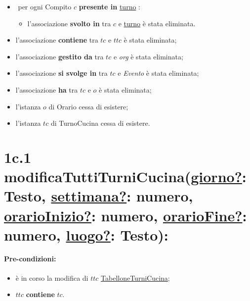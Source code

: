 {\begin{itemize}
   \item \textlangle $ $ per ogni Compito $c$ \textbf{presente in} \underline{turno} \textrangle:
    \begin{itemize}
        \item l'associazione \textbf{svolto in} tra $c$ e \underline{turno} è stata eliminata.
    \end{itemize}
    \item l'associazione \textbf{contiene} tra $tc$ e $ttc$ è stata eliminata;
    \item l'associazione \textbf{gestito da} tra $tc$ e \textit{org} è stata eliminata;
\item l'associazione \textbf{si svolge in} tra $tc$ e \textit{Evento} è stata eliminata;
    \item l'associazione \textbf{ha} tra $tc$ e $o$ è stata eliminata;
    \item l'istanza $o$ di Orario cessa di esistere;
    \item l'istanza $tc$ di TurnoCucina cessa di esistere.
\end{itemize}

\section*{1c.1 modificaTuttiTurniCucina(\underline{giorno?}: Testo, \underline{settimana?}: numero, \underline{orarioInizio?}: numero, \underline{orarioFine?}: numero, \underline{luogo?}: Testo):}

\paragraph{Pre-condizioni:}
\begin{itemize}
 \item è in corso la modifica di $ttc$ \underline{TabelloneTurniCucina};
 \item $ttc$ \textbf{contiene} $tc$.
\end{itemize}

}
